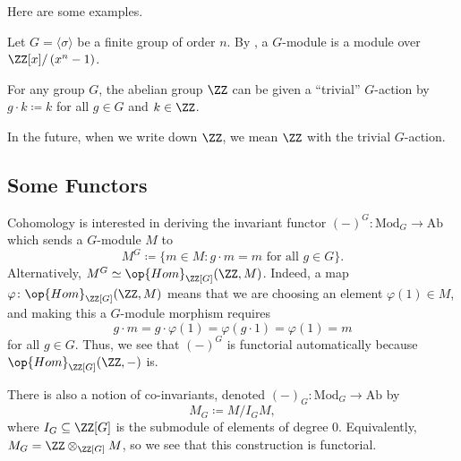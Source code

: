 \documentclass[../notes.tex]{subfiles}
\begin{document}
Here are some examples.
\begin{example}
	Let $G=\langle\sigma\rangle$ be a finite group of order $n$. By , a $G$-module is a module over $\ZZ[x]/\left(x^n-1\right)$.
\end{example}
\begin{example}
	For any group $G$, the abelian group $\ZZ$ can be given a ``trivial'' $G$-action by $g\cdot k\coloneqq k$ for all $g\in G$ and $k\in\ZZ$.
\end{example}
In the future, when we write down $\ZZ$, we mean $\ZZ$ with the trivial $G$-action.

\subsection{Some Functors}
Cohomology is interested in deriving the invariant functor $(-)^G\colon\mathrm{Mod}_G\to\mathrm{Ab}$ which sends a $G$-module $M$ to
\[M^G\coloneqq\{m\in M:g\cdot m=m\text{ for all }g\in G\}.\]
Alternatively, $M^G\simeq\op{Hom}_{\ZZ[G]}(\ZZ,M)$. Indeed, a map $\varphi\colon\op{Hom}_{\ZZ[G]}(\ZZ,M)$ means that we are choosing an element $\varphi(1)\in M$, and making this a $G$-module morphism requires
\[g\cdot m=g\cdot\varphi(1)=\varphi(g\cdot1)=\varphi(1)=m\]
for all $g\in G$. Thus, we see that $(-)^G$ is functorial automatically because $\op{Hom}_{\ZZ[G]}(\ZZ,-)$ is.

There is also a notion of co-invariants, denoted $(-)_G\colon\mathrm{Mod}_G\to\mathrm{Ab}$ by
\[M_G\coloneqq M/I_GM,\]
where $I_G\subseteq\ZZ[G]$ is the submodule of elements of degree $0$. Equivalently, $M_G=\ZZ\otimes_{\ZZ[G]}M$, so we see that this construction is functorial.
\end{document}
